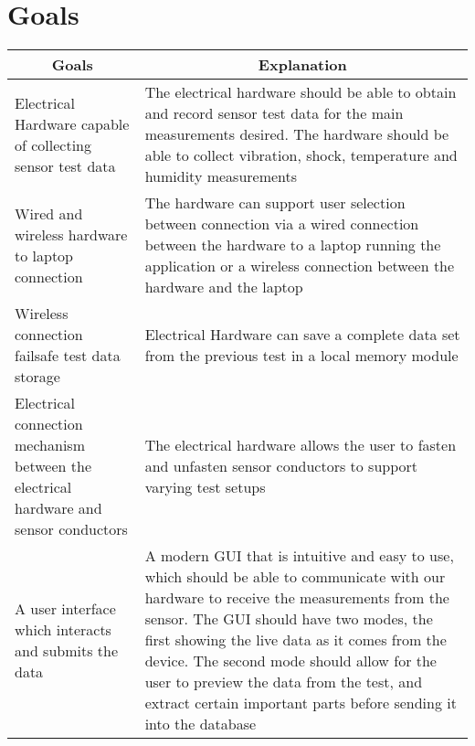 \documentclass{article}
\begin{document}
\section{Goals}
    \begin{table}[H]
        \centering
        \begin{tabular}{|p{4cm}|p{8cm}|}
        \hline
        \multicolumn{1}{|c|}{\textbf{Goals}} & \multicolumn{1}{c|}{\textbf{Explanation}} 
        \\ \hline
        Electrical Hardware capable of collecting sensor test data
        & The electrical hardware should be able to obtain and record sensor test data for the main measurements desired. The hardware should be able to collect vibration, shock, temperature and humidity measurements
        \newline                                
        \\ \hline
        Wired and wireless hardware to laptop connection
        & The hardware can support user selection between connection via a wired connection between the hardware to a laptop running the application or a wireless connection between the hardware and the laptop
        \newline                                
        \\ \hline
        Wireless connection failsafe test data storage
        & Electrical Hardware can save a complete data set from the previous test in a local memory module
        \newline                                
        \\ \hline
        Electrical connection mechanism between the electrical hardware and sensor conductors
        & The electrical hardware allows the user to fasten and unfasten sensor conductors to support varying test setups
        \newline                                
        \\ \hline
        A user interface which interacts and submits the data                                 
        & A modern GUI that is intuitive and easy to use, which should be able to communicate with our hardware to receive the measurements from the sensor. The GUI should have two modes, the first showing the live data as it comes from the device. The second mode should allow for the user to preview the data from the test, and extract certain important parts before sending it into the database  
        \newline                                

\end{tabular}
\end{table}
\end{document}
